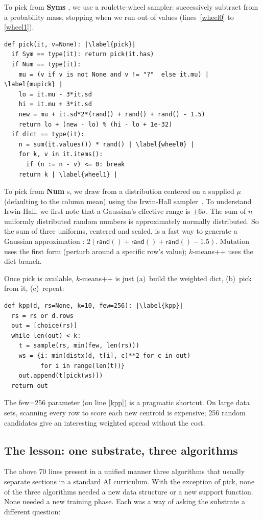 \documentclass[AMA,STIX2COL]{WileyNJDv5}
\newcommand{\cls}[1]{%
  \setlength{\fboxsep}{1.5pt}%
  \colorbox{clsbg}{\sffamily\bfseries{#1}}%
}
\begin{document}
 To pick from \cls{Syms}, we use a 
roulette-wheel sampler: successively subtract from a probability mass,
stopping when we run out of values
 (lines~\ref{wheel0} to \ref{wheel1}).
\begin{verbatim}
def pick(it, v=None): |\label{pick}|
  if Sym == type(it): return pick(it.has)
  if Num == type(it):
    mu = (v if v is not None and v != "?"  else it.mu) | \label{mupick} |
    lo = it.mu - 3*it.sd
    hi = it.mu + 3*it.sd
    new = mu + it.sd*2*(rand() + rand() + rand() - 1.5)
    return lo + (new - lo) % (hi - lo + 1e-32)
  if dict == type(it):
    n = sum(it.values()) * rand() | \label{wheel0} |
    for k, v in it.items():
      if (n := n - v) <= 0: break
    return k | \label{wheel1} |
\end{verbatim}
To pick from \cls{Num}s, we draw from a distribution centered on a supplied $\mu$ (defaulting to
the column mean) using the Irwin-Hall
sampler~\cite{johnson1995continuous}. 
To understand Irwin-Hall, we first note that a Gaussian's effective range is
$\pm 6\sigma$. The sum of $n$ uniformly distributed random numbers is approximately
normally distributed. So the sum of three uniforms, centered and
scaled, is a fast way to generate a Gaussian approximation : $2(\textsf{rand}() + \textsf{rand}() + \textsf{rand}() -
1.5)$. Mutation uses the first form (perturb around
a specific row's value); $k$-means++ uses the dict branch.

 
Once \textsf{pick} is available, $k$-means++ is just (a)~build
the weighted dict, (b)~pick from it, (c)~repeat:

\begin{verbatim}
def kpp(d, rs=None, k=10, few=256): |\label{kpp}|
  rs = rs or d.rows
  out = [choice(rs)]
  while len(out) < k:
    t = sample(rs, min(few, len(rs)))
    ws = {i: min(distx(d, t[i], c)**2 for c in out)
          for i in range(len(t))}
    out.append(t[pick(ws)])
  return out
\end{verbatim}
The \textsf{few=256} parameter  (on line \ref{kpp}) is a pragmatic shortcut. On large
data sets, scanning every row to score each new centroid is
expensive; 256 random candidates give an interesting weighted
spread without the cost.

\subsection*{The lesson: one substrate, three algorithms}
The above 70 lines present in a unified manner three algorithms that
usually separate sections in a standard AI curriculum.
With the exception of \textsf{pick},
none of the three algorithms needed a new data structure or a
new support function. None needed a new training phase. Each was
a way of asking the substrate a different question:
\end{document}

